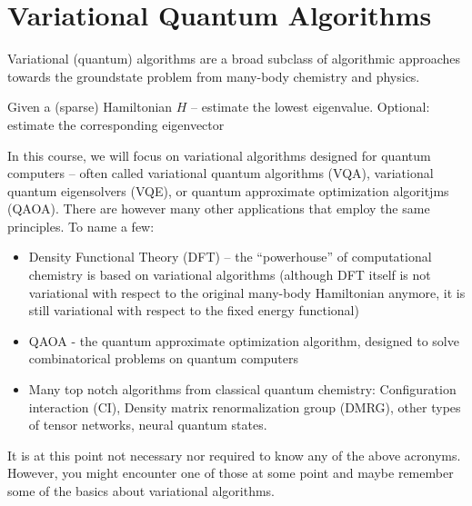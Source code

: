 \section{Variational Quantum Algorithms}

Variational (quantum) algorithms are a broad subclass of algorithmic approaches towards the groundstate problem from many-body chemistry and physics. 
\begin{def*}
Given a (sparse) Hamiltonian $H$ -- estimate the lowest eigenvalue. Optional: estimate the corresponding eigenvector
\end{def*}
In this course, we will focus on variational algorithms designed for quantum computers -- often called variational quantum algorithms (VQA), variational quantum eigensolvers (VQE), or quantum approximate optimization algoritjms (QAOA). 
There are however many other applications that employ the same principles. To name a few:
\begin{itemize}
    \item Density Functional Theory (DFT) -- the ``powerhouse'' of computational chemistry is based on variational algorithms (although DFT itself is not variational with respect to the original many-body Hamiltonian anymore, it is still variational with respect to the fixed energy functional)
    \item QAOA - the quantum approximate optimization algorithm, designed to solve combinatorical problems on quantum computers
    \item Many top notch algorithms from classical quantum chemistry: Configuration interaction (CI), Density matrix renormalization group (DMRG), other types of tensor networks, neural quantum states.
\end{itemize}
It is at this point not necessary nor required to know any of the above acronyms. However, you might encounter one of those at some point and maybe remember some of the basics about variational algorithms. 

